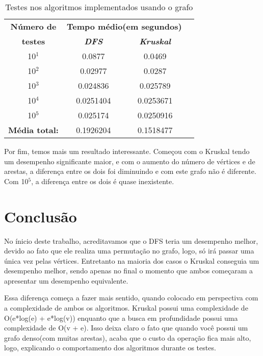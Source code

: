 \documentclass[12pt]{article}
\begin{document}
  \begin{table}[htbp]
    \caption{Testes nos algoritmos implementados usando o grafo }
    \begin{center}
    \begin{tabular}{|c|c|c|c|}
    \hline
    \textbf{Número de}&\multicolumn{2}{|c|}{\textbf{Tempo médio(em segundos)}} \\
    \cline{2-3} 
    \textbf{testes} & \textbf{\textit{DFS}}& \textbf{\textit{Kruskal}} \\
    \hline
    10$^{\mathrm{1}}$& 0.0877 & 0.0469 \\
    \hline
    10$^{\mathrm{2}}$& 0.02977 & 0.0287 \\
    \hline
    10$^{\mathrm{3}}$& 0.024836 & 0.025789 \\
    \hline
    10$^{\mathrm{4}}$& 0.0251404 & 0.0253671 \\
    \hline
    10$^{\mathrm{5}}$& 0.025174 & 0.0250916 \\
    \hline
    \textbf{Média total:} & 0.1926204 & 0.1518477 \\
    \hline
    \end{tabular}
    \end{center}
  \end{table}

  \newpage

  Por fim, temos mais um resultado interessante. Começou com o Kruskal tendo um desempenho 
  significante maior, e com o aumento do número de vértices e de arestas, a diferença entre 
  os dois foi diminuindo e com este grafo não é diferente. Com 10$^{\mathrm{5}}$, a diferença 
  entre os dois é quase inexistente.

  \newpage
  
  \section{Conclusão} \label{sec:conclusion}

  No ínicio deste trabalho, acreditavamos que o DFS teria um desempenho melhor, devido ao fato que
  ele realiza uma permutação no grafo, logo, só irá passar uma única vez pelas vértices. Entretanto 
  na maioria dos casos o Kruskal conseguia um desempenho melhor, sendo apenas no final o momento que 
  ambos começaram a apresentar um desempenho equivalente.

  Essa diferença começa a fazer mais sentido, quando colocado em perspectiva com a complexidade
  de ambos os algoritmos. Kruskal possui uma complexidade de O(e*log(e) + e*log(v)) enquanto que 
  a busca em profundidade possui uma complexidade de O(v + e). Isso deixa claro o fato que quando 
  você possui um grafo denso(com muitas arestas), acaba que o custo da operação fica mais alto, logo, 
  explicando o comportamento dos algoritmos durante os testes.
\end{document}
